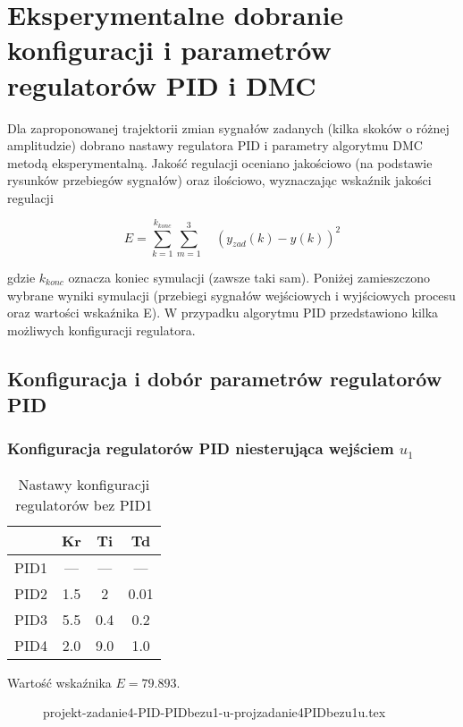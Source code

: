\section{Eksperymentalne dobranie konfiguracji i parametrów regulatorów PID i DMC}
\label{projekt:zad4}

Dla zaproponowanej trajektorii zmian sygnałów zadanych (kilka skoków o różnej amplitudzie)
dobrano nastawy regulatora PID i parametry algorytmu DMC metodą eksperymentalną.
Jakość regulacji oceniano jakościowo (na podstawie rysunków przebiegów
sygnałów) oraz ilościowo, wyznaczając wskaźnik jakości regulacji

$$
E=\sum_{k=1}^{k_{konc}} \sum_{m=1}^{3} \quad (y_{zad}(k)-y(k))^{2}
$$

gdzie $k_{konc}$ oznacza koniec symulacji (zawsze taki sam). Poniżej zamieszczono wybrane wyniki symulacji
(przebiegi sygnałów wejściowych i wyjściowych procesu oraz wartości wskaźnika
E). 
\newline
W przypadku algorytmu PID przedstawiono kilka możliwych konfiguracji regulatora.

\subsection{Konfiguracja i dobór parametrów regulatorów PID}

\subsubsection{Konfiguracja regulatorów PID niesterująca wejściem $u_{1}$}

\begin{table}[H]
    \centering
    \begin{tabular}{|l|c|c|c|}
    \hline
         & Kr  & Ti  & Td  \\ \hline
    PID1 & --- & --- & --- \\ \hline
    PID2 & 1.5 & 2 & 0.01  \\ \hline
    PID3 & 5.5 & 0.4 & 0.2 \\ \hline
    PID4 & 2.0 & 9.0 & 1.0 \\ \hline
    \end{tabular}
    \caption[H]{Nastawy konfiguracji regulatorów bez PID1}
\end{table}

Wartość wskaźnika $E=\num{79.893}$.

\ifdefined\CompileFigures
    \begin{figure}[H] 
        \centering
        
        \caption{projekt-zadanie4-PID-PIDbezu1-u-projzadanie4PIDbezu1u.tex}
        \label{projekt:zad4:figure:uprojzadanie4PIDbezu1u}
    \end{figure}
\fi

